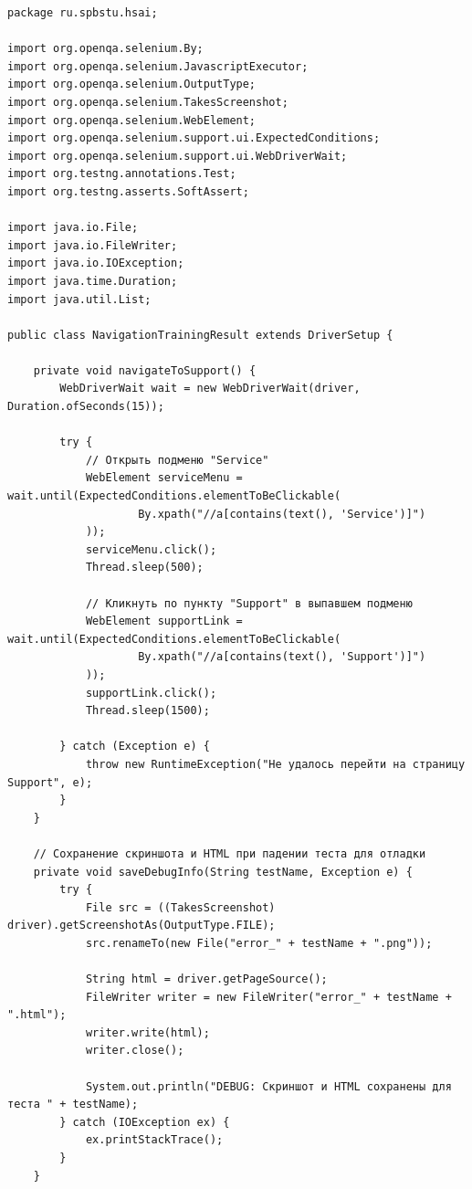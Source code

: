 \documentclass{article}[14pt]
\begin{document}
\begin{lstlisting}
package ru.spbstu.hsai;

import org.openqa.selenium.By;
import org.openqa.selenium.JavascriptExecutor;
import org.openqa.selenium.OutputType;
import org.openqa.selenium.TakesScreenshot;
import org.openqa.selenium.WebElement;
import org.openqa.selenium.support.ui.ExpectedConditions;
import org.openqa.selenium.support.ui.WebDriverWait;
import org.testng.annotations.Test;
import org.testng.asserts.SoftAssert;

import java.io.File;
import java.io.FileWriter;
import java.io.IOException;
import java.time.Duration;
import java.util.List;

public class NavigationTrainingResult extends DriverSetup {

    private void navigateToSupport() {
        WebDriverWait wait = new WebDriverWait(driver, Duration.ofSeconds(15));

        try {
            // Открыть подменю "Service"
            WebElement serviceMenu = wait.until(ExpectedConditions.elementToBeClickable(
                    By.xpath("//a[contains(text(), 'Service')]")
            ));
            serviceMenu.click();
            Thread.sleep(500);

            // Кликнуть по пункту "Support" в выпавшем подменю
            WebElement supportLink = wait.until(ExpectedConditions.elementToBeClickable(
                    By.xpath("//a[contains(text(), 'Support')]")
            ));
            supportLink.click();
            Thread.sleep(1500);

        } catch (Exception e) {
            throw new RuntimeException("Не удалось перейти на страницу Support", e);
        }
    }

    // Сохранение скриншота и HTML при падении теста для отладки
    private void saveDebugInfo(String testName, Exception e) {
        try {
            File src = ((TakesScreenshot) driver).getScreenshotAs(OutputType.FILE);
            src.renameTo(new File("error_" + testName + ".png"));

            String html = driver.getPageSource();
            FileWriter writer = new FileWriter("error_" + testName + ".html");
            writer.write(html);
            writer.close();

            System.out.println("DEBUG: Скриншот и HTML сохранены для теста " + testName);
        } catch (IOException ex) {
            ex.printStackTrace();
        }
    }


\end{lstlisting}
\end{document}
